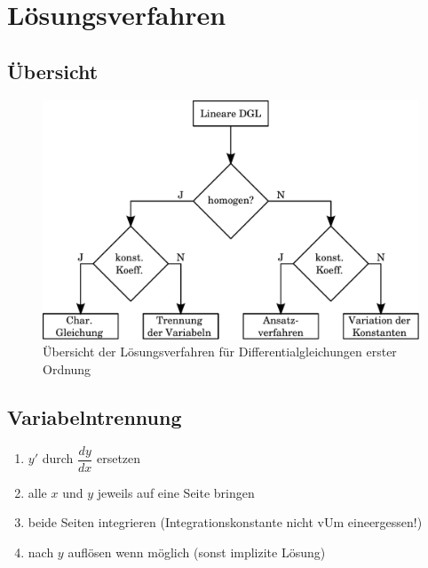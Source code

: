 \newpage
\section{Lösungsverfahren}

\subsection{Übersicht}
\begin{figure}[h!]
	\centering
	\includegraphics[width=1\textwidth]{diffgl_loes.pdf}
	\caption{Übersicht der Lösungsverfahren für Differentialgleichungen 
	erster Ordnung}
\end{figure}

\subsection{Variabelntrennung}
\begin{enumerate}
  \item $y'$ durch $\dfrac{dy}{dx}$ ersetzen
  \item alle $x$ und $y$ jeweils auf eine Seite bringen
  \item beide Seiten integrieren (Integrationskonstante nicht vUm eineergessen!)
  \item nach $y$ auflösen wenn möglich (sonst implizite Lösung)
\end{enumerate}

